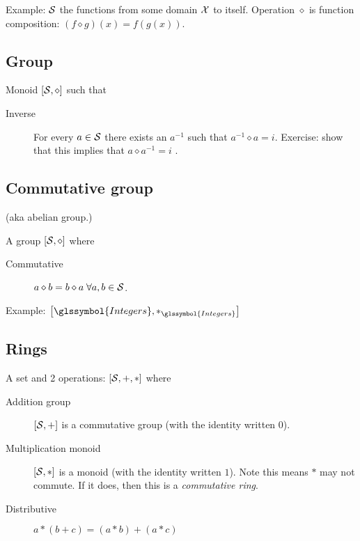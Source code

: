 Example: 
${\mathcal{S}}$ the functions from some domain ${\mathcal{X}}$ to itself. 
Operation $\diamond$ is function composition:
$\left( f \diamond g \right) (x) = 
f \left( g \left( x \right) \right)$.

\subsection{Group}

Monoid $\left[ {\mathcal{S}}, \diamond \right]$ such that
\begin{description}
 \item[Inverse] For every $a \in {\mathcal{S}}$ there exists an
 $a^{-1}$ such that $a^{-1} \diamond a = i$.
 Exercise: show that this implies that $a \diamond a^{-1} = i$ .
\end{description}

\subsection{Commutative group}

(aka abelian group.)

A group $\left[ {\mathcal{S}}, \diamond \right]$ where
\begin{description}
 \item[Commutative] $a \diamond b = b \diamond a \; \forall a,b \in {\mathcal{S}}$.
\end{description}

Example: 
$\left[ \glssymbol{Integers}, *_{\glssymbol{Integers}} \right]$

\subsection{Rings}
\label{sec:Rings}
\cite{wiki:Ring-mathematics}

A set and 2 operations: $\left[ {\mathcal{S}}, +, * \right]$
where
\begin{description}
  \item[Addition group] $\left[ {\mathcal{S}}, + \right]$ 
  is a commutative group (with the identity written $0$).
  \item[Multiplication monoid] $\left[ {\mathcal{S}}, * \right]$ 
  is a monoid (with the identity written $1$).
  Note this means $*$ may not commute. If it does, 
  then this is a \textit{commutative ring}.
  \item[Distributive] $a * \left( b + c \right) 
  = \left( a * b \right) + \left( a * c \right)$
\end{description}

